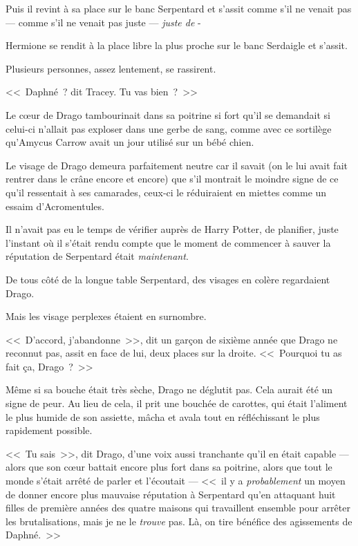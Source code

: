 Puis il revint à sa place sur le banc Serpentard et s'assit comme s'il ne venait pas — comme s'il ne venait pas juste — \emph{juste de} -

Hermione se rendit à la place libre la plus proche sur le banc Serdaigle et s'assit.

Plusieurs personnes, assez lentement, se rassirent.

<<~Daphné~? dit Tracey. Tu vas bien~?~>>

\later

Le cœur de Drago tambourinait dans sa poitrine si fort qu'il se demandait si celui-ci n'allait pas exploser dans une gerbe de sang, comme avec ce sortilège qu'Amycus Carrow avait un jour utilisé sur un bébé chien.

Le visage de Drago demeura parfaitement neutre car il savait (on le lui avait fait rentrer dans le crâne encore et encore) que s'il montrait le moindre signe de ce qu'il ressentait à ses camarades, ceux-ci le réduiraient en miettes comme un essaim d'Acromentules.

Il n'avait pas eu le temps de vérifier auprès de Harry Potter, de planifier, juste l'instant où il s'était rendu compte que le moment de commencer à sauver la réputation de Serpentard était \emph{maintenant}.

De tous côté de la longue table Serpentard, des visages en colère regardaient Drago.

Mais les visage perplexes étaient en surnombre.

<<~D'accord, j'abandonne~>>, dit un garçon de sixième année que Drago ne reconnut pas, assit en face de lui, deux places sur la droite. <<~Pourquoi tu as fait ça, Drago~?~>>

Même si sa bouche était très sèche, Drago ne déglutit pas. Cela aurait été un signe de peur. Au lieu de cela, il prit une bouchée de carottes, qui était l'aliment le plus humide de son assiette, mâcha et avala tout en réfléchissant le plus rapidement possible.

<<~Tu sais~>>, dit Drago, d'une voix aussi tranchante qu'il en était capable — alors que son cœur battait encore plus fort dans sa poitrine, alors que tout le monde s'était arrêté de parler et l'écoutait — <<~il y a \emph{probablement} un moyen de donner encore plus mauvaise réputation à Serpentard qu'en attaquant huit filles de première années des quatre maisons qui travaillent ensemble pour arrêter les brutalisations, mais je ne le \emph{trouve} pas. Là, on tire bénéfice des agissements de Daphné.~>>

